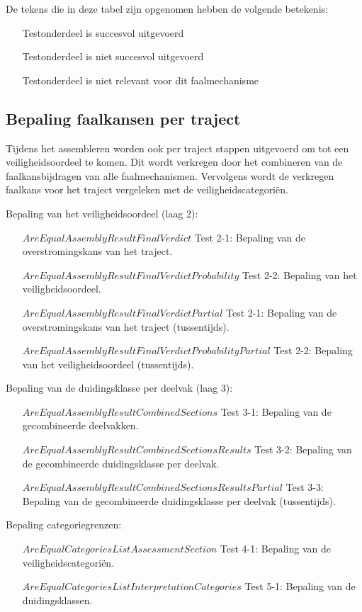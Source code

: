 De tekens die in deze tabel zijn opgenomen hebben de volgende betekenis:
\begin{itemize}
	\item [\cmark] Testonderdeel is succesvol uitgevoerd
	\item [\xmark] Testonderdeel is niet succesvol uitgevoerd
	\item [\nmark] Testonderdeel is niet relevant voor dit faalmechanisme
\end{itemize}

\subsection{Bepaling faalkansen per traject}
	\label{sec:$Order$:pertraject}
Tijdens het assembleren worden ook per traject stappen uitgevoerd om tot een veiligheidsoordeel te komen. Dit wordt verkregen door het combineren van de faalkansbijdragen van alle faalmechanismen. Vervolgens wordt de verkregen faalkans voor het traject vergeleken met de veiligheidscategori\"en.

Bepaling van het veiligheidsoordeel (laag 2):
\begin{itemize}
	\item [$AreEqualAssemblyResultFinalVerdict$]Test 2-1: Bepaling van de overstromingskans van het traject.
	\item [$AreEqualAssemblyResultFinalVerdictProbability$]Test 2-2: Bepaling van het veiligheidsoordeel.
	\item [$AreEqualAssemblyResultFinalVerdictPartial$]Test 2-1: Bepaling van de overstromingskans van het traject (tussentijds).
	\item [$AreEqualAssemblyResultFinalVerdictProbabilityPartial$]Test 2-2: Bepaling van het veiligheidsoordeel (tussentijds).
\end{itemize}

Bepaling van de duidingsklasse per deelvak (laag 3):
\begin{itemize}
	\item [$AreEqualAssemblyResultCombinedSections$] Test 3-1: Bepaling van de gecombineerde deelvakken.
	\item [$AreEqualAssemblyResultCombinedSectionsResults$] Test 3-2: Bepaling van de gecombineerde duidingsklasse per deelvak.
	\item [$AreEqualAssemblyResultCombinedSectionsResultsPartial$] Test 3-3: Bepaling van de gecombineerde duidingsklasse per deelvak (tussentijds).
\end{itemize}

Bepaling categoriegrenzen:
\begin{itemize}
	\item [$AreEqualCategoriesListAssessmentSection$]Test 4-1: Bepaling van de veiligheidscategori\"en.
	\item [$AreEqualCategoriesListInterpretationCategories$]Test 5-1: Bepaling van de duidingsklassen.
\end{itemize}
